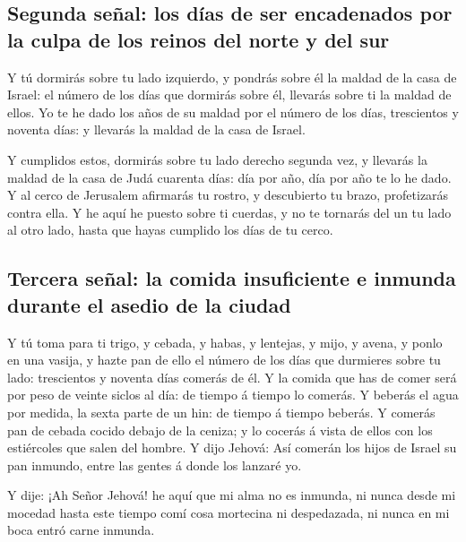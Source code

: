 \hypertarget{segunda-seuxf1al-los-duxedas-de-ser-encadenados-por-la-culpa-de-los-reinos-del-norte-y-del-sur}{%
\subsection{Segunda señal: los días de ser encadenados por la culpa de
los reinos del norte y del
sur}\label{segunda-seuxf1al-los-duxedas-de-ser-encadenados-por-la-culpa-de-los-reinos-del-norte-y-del-sur}}

 Y tú dormirás sobre tu lado izquierdo, y pondrás sobre él
la maldad de la casa de Israel: el número de los días que dormirás sobre
él, llevarás sobre ti la maldad de ellos.  Yo te he dado
los años de su maldad por el número de los días, trescientos y noventa
días: y llevarás la maldad de la casa de Israel.

 Y cumplidos estos, dormirás sobre tu lado derecho segunda
vez, y llevarás la maldad de la casa de Judá cuarenta días: día por año,
día por año te lo he dado.  Y al cerco de Jerusalem
afirmarás tu rostro, y descubierto tu brazo, profetizarás contra ella.
 Y he aquí he puesto sobre ti cuerdas, y no te tornarás
del un tu lado al otro lado, hasta que hayas cumplido los días de tu
cerco.

\hypertarget{tercera-seuxf1al-la-comida-insuficiente-e-inmunda-durante-el-asedio-de-la-ciudad}{%
\subsection{Tercera señal: la comida insuficiente e inmunda durante el
asedio de la
ciudad}\label{tercera-seuxf1al-la-comida-insuficiente-e-inmunda-durante-el-asedio-de-la-ciudad}}

 Y tú toma para ti trigo, y cebada, y habas, y lentejas, y
mijo, y avena, y ponlo en una vasija, y hazte pan de ello el número de
los días que durmieres sobre tu lado: trescientos y noventa días comerás
de él.  Y la comida que has de comer será por peso de
veinte siclos al día: de tiempo á tiempo lo comerás.  Y
beberás el agua por medida, la sexta parte de un hin: de tiempo á tiempo
beberás.  Y comerás pan de cebada cocido debajo de la
ceniza; y lo cocerás á vista de ellos con los estiércoles que salen del
hombre.  Y dijo Jehová: Así comerán los hijos de Israel
su pan inmundo, entre las gentes á donde los lanzaré yo.

 Y dije: ¡Ah Señor Jehová! he aquí que mi alma no es
inmunda, ni nunca desde mi mocedad hasta este tiempo comí cosa mortecina
ni despedazada, ni nunca en mi boca entró carne inmunda.

